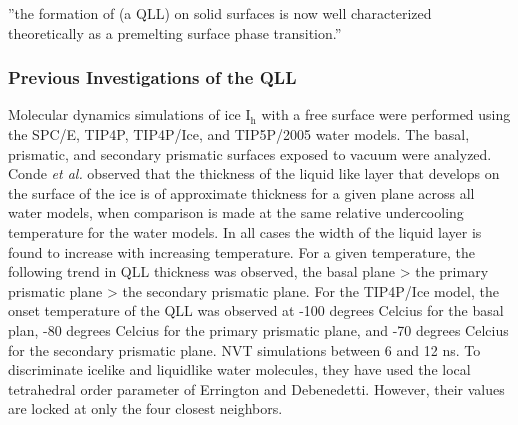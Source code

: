 ''the formation of (a QLL) on solid surfaces is now well characterized
theoretically as a premelting surface phase
transition.''\cite{R. Lipowsky, Phys. Rev. Lett. 49, 1575 (1982).}

\subsubsection{Previous Investigations of the QLL}
Molecular dynamics simulations of ice I$_\mathrm{h}$ with a free
surface were performed using the SPC/E, TIP4P, TIP4P/Ice, and
TIP5P/2005 water models. The basal, prismatic, and secondary prismatic
surfaces exposed to vacuum were analyzed. Conde \textit{et al.}
observed that the thickness of the liquid like layer that develops on
the surface of the ice is of approximate thickness for a given plane
across all water models, when comparison is made at the same relative
undercooling temperature for the water models.\cite{Conde2008} In all cases the width
of the liquid layer is found to increase with increasing
temperature. For a given temperature, the following trend in QLL
thickness was observed, the basal plane > the primary prismatic plane
> the secondary prismatic plane. For the TIP4P/Ice model, the onset
temperature of the QLL was observed at -100 degrees Celcius for the
basal plan, -80 degrees Celcius for the primary prismatic plane, and
-70 degrees Celcius for the secondary prismatic plane. NVT simulations
between 6 and 12 ns. To discriminate icelike and liquidlike water
molecules, they have used the local tetrahedral order parameter of
Errington and Debenedetti. However, their values are locked at only
the four closest neighbors. 

